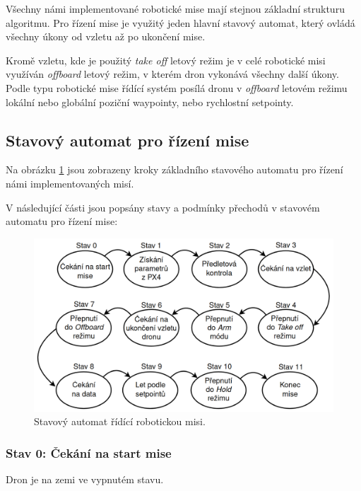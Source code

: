 Všechny námi implementované robotické mise mají stejnou základní strukturu algoritmu. Pro řízení mise je využitý jeden hlavní stavový automat, který ovládá všechny úkony od vzletu až po ukončení mise.

Kromě vzletu, kde je použitý \textit{take off} letový režim je v celé robotické misi využíván \textit{offboard} letový režim, v kterém dron vykonává všechny další úkony. Podle typu robotické mise řídící systém posílá dronu v \textit{offboard} letovém režimu lokální nebo globální poziční waypointy, nebo rychlostní setpointy.

\subsection{Stavový automat pro řízení mise}

Na obrázku \ref{fig:MISE2} jsou zobrazeny kroky základního stavového automatu pro řízení námi implementovaných misí.

V následující části jsou popsány stavy a podmínky přechodů v stavovém automatu pro řízení mise:

\begin{figure}[!ht]
  \begin{center}
    \includegraphics[scale=0.32]{obrazky/MISEAUTOMAT}
  \end{center}
  \caption[Stavový automat řídící robotickou misi]{Stavový automat řídící robotickou misi.}
  \label{fig:MISE2}
\end{figure}

\subsubsection{Stav 0: Čekání na start mise}

Dron je na zemi ve vypnutém stavu.

